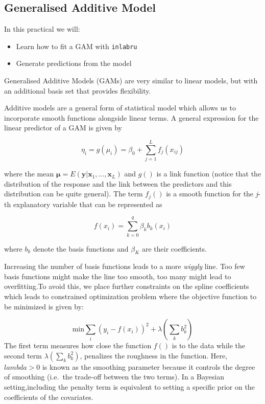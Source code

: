 \documentclass[
  letterpaper,
  DIV=11,
  numbers=noendperiod]{scrartcl}
\providecommand{\tightlist}{%
  \setlength{\itemsep}{0pt}\setlength{\parskip}{0pt}}\usepackage{longtable,booktabs,array}
\begin{document}
\subsection{Generalised Additive Model}\label{sec-gam_ex}

In this practical we will:

\begin{itemize}
\tightlist
\item
  Learn how to fit a GAM with \texttt{inlabru}
\item
  Generate predictions from the model
\end{itemize}

Generalised Additive Models (GAMs) are very similar to linear models,
but with an additional basis set that provides flexibility.

Additive models are a general form of statistical model which allows us
to incorporate smooth functions alongside linear terms. A general
expression for the linear predictor of a GAM is given by

\[
\eta_i = g(\mu_i) = \beta_0 + \sum_{j=1}^L f_j(x_{ij}) 
\]

where the mean
\(\pmb{\mu} = E(\mathbf{y}|\mathbf{x}_1,\ldots,\mathbf{x}_L)\) and
\(g()\) is a link function (notice that the distribution of the response
and the link between the predictors and this distribution can be quite
general). The term \(f_j()\) is a smooth function for the \emph{j}-th
explanatory variable that can be represented as

\[
f(x_i) = \sum_{k=0}^q\beta_k b_k(x_i)
\]

where \(b_k\) denote the basis functions and \(\beta_K\) are their
coefficients.

Increasing the number of basis functions leads to a more \emph{wiggly}
line. Too few basis functions might make the line too smooth, too many
might lead to overfitting.To avoid this, we place further constraints on
the spline coefficients which leads to constrained optimization problem
where the objective function to be minimized is given by:

\[
\mathrm{min}\sum_i(y_i-f(x_i))^2 + \lambda(\sum_kb^2_k)
\] The first term measures how close the function \(f()\) is to the data
while the second term \(\lambda(\sum_kb^2_k)\), penalizes the roughness
in the function. Here, \(lambda >0\) is known as the smoothing parameter
because it controls the degree of smoothing (i.e.~the trade-off between
the two terms). In a Bayesian setting,including the penalty term is
equivalent to setting a specific prior on the coefficients of the
covariates.
\end{document}
